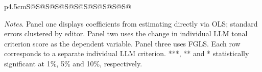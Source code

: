 \begin{table}
\begin{threeparttable}
\begin{tabular}{p{4.5cm}S@{}S@{}S@{}S@{}S@{}S@{}S@{}S@{}S@{}S@{}S@{}}
            \bottomrule
        \end{tabular}
        \begin{tablenotes}
            \tiny
            \item \textit{Notes}. Panel one displays coefficients from estimating directly via OLS; standard errors clustered by editor. Panel two uses the change in individual LLM tonal criterion score as the dependent variable. Panel three uses FGLS. Each row corresponds to a separate individual LLM criterion. ***, ** and * statistically significant at 1\%, 5\% and 10\%, respectively.
        \end{tablenotes}
    \end{threeparttable}

\end{table}
